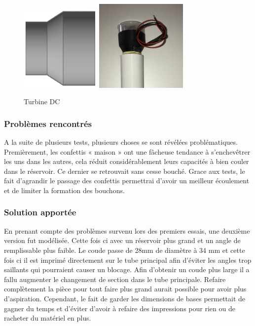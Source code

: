 \begin{figure}[H]
    \centering
    \includegraphics[width=0.35\textwidth]{Images/photos_PGA/adaptmotventi.PNG}
    \includegraphics[width=0.4\textwidth]{Images/photos_PGA/zoomTurbine.jpg}
    \caption{Turbine DC}
    \label{fig:turbine}
\end{figure}

\subsubsection{Problèmes rencontrés}

A la suite de plusieurs tests, plusieurs choses se sont révélées problématiques. Premièrement, les 
confettis « maison » ont une fâcheuse tendance à s’enchevêtrer les uns dans les autres, cela réduit 
considérablement leurs capacités à bien couler dans le réservoir. Ce dernier se retrouvait sans cesse 
bouché. Grace aux tests, le fait d’agrandir le passage des confettis permettrai d’avoir un meilleur 
écoulement et de limiter la formation des bouchons.

\subsubsection{Solution apportée}

En prenant compte des problèmes survenu lors des premiers essais, une deuxième version fut modélisée. 
Cette fois ci avec un réservoir plus grand et un angle de remplissable plus faible. Le coude passe 
de 28mm de diamètre à 34 mm et cette fois ci il est imprimé directement sur le tube principal afin 
d’éviter les angles trop saillants qui pourraient causer un blocage. Afin d’obtenir un coude plus large 
il a fallu augmenter le changement de section dans le tube principale. Refaire complètement la pièce 
pour tout faire plus grand aurait possible pour avoir plus d’aspiration. Cependant, le fait de garder 
les dimensions de bases permettait de gagner du temps et d’éviter d’avoir à refaire des impressions 
pour rien ou de racheter du matériel en plus.

